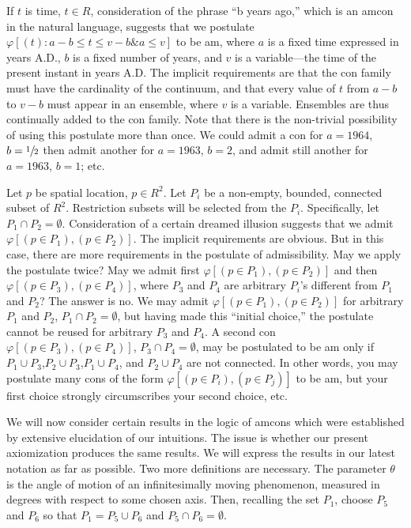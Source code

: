 If $t$ is time, $t\in R$, consideration of the phrase \enquote{b years ago,} which is an 
amcon in the natural language, suggests that we postulate $\varphi[(t):a-b\leq t\leq v-b \&a\leq v]$ to be am,
where $a$ is a fixed time expressed in years A.D., $b$ is a fixed 
number of years, and $v$ is a variable---the time of the present instant in years 
A.D. The implicit requirements are that the con family must have the 
cardinality of the continuum, and that every value of $t$ from $a-b$ to $v-b$ must 
appear in an ensemble, where $v$ is a variable. Ensembles are thus continually 
added to the con family. Note that there is the non-trivial possibility of using 
this postulate more than once. We could admit a con for $a=1964$, $b=\sfrac{1}{2}$
then admit another for $a=1963$, $b=2$, and admit still another for $a=1963$,
$b=1$; etc. 

Let $p$ be spatial location, $p\in R^2$. Let $P_i$ be a non-empty, bounded, 
connected subset of $R^2$. Restriction subsets will be selected from the $P_i$.
Specifically, let $P_1\cap P_2=\emptyset$. Consideration of a certain dreamed illusion 
suggests that we admit $\varphi[(p\in P_1),(p\in P_2)]$. The implicit requirements are 
obvious. But in this case, there are more requirements in the postulate of 
admissibility. May we apply the postulate twice? May we admit first 
$\varphi[(p\in P_1),(p\in P_2)]$ and then $\varphi[(p\in P_3),(p\in P_4)]$, where $P_3$ and $P_4$ are arbitrary 
$P_i$'s different from $P_1$ and $P_2$? The answer is no. We may admit 
$\varphi[(p\in P_1),(p\in P_2)]$ for arbitrary $P_1$ and $P_2$, $P_1\cap P_2=\emptyset$, but having made this \enquote{initial 
choice,} the postulate cannot be reused for arbitrary $P_3$ and $P_4$. A second 
con $\varphi[(p\in P_3),(p\in P_4)]$, $P_3\cap P_4=\emptyset$, may be postulated to be am only if 
$P_1\cup P_3$,$P_2\cup P_3$,$P_1\cup P_4$, and $P_2\cup P_4$ are not connected. In other words, you 
may postulate many cons of the form $\varphi[(p\in P_i),(p\in P_j)]$ to be am, but 
your first choice strongly circumscribes your second choice, etc. 

We will now consider certain results in the logic of amcons which were 
established by extensive elucidation of our intuitions. The issue is whether 
our present axiomization produces the same results. We will express the 
results in our latest notation as far as possible. Two more definitions are 
necessary. The parameter $\theta$ is the angle of motion of an infinitesimally 
moving phenomenon, measured in degrees with respect to some chosen axis. 
Then, recalling the set $P_1$, choose $P_5$ and $P_6$ so that $P_1=P_5\cup P_6$ and 
$P_5\cap P_6=\emptyset$. 

